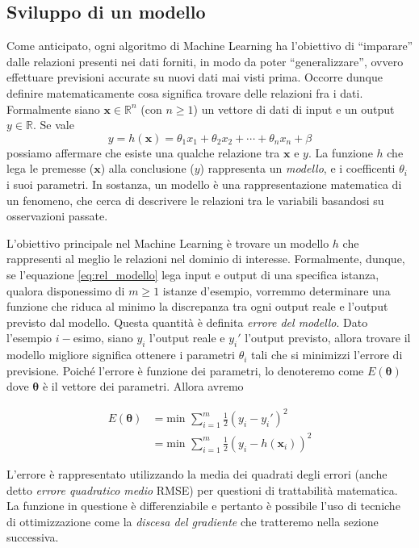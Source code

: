 \documentclass[12pt,a4paper,twoside,openright]{book}
\begin{document}
\subsection{Sviluppo di un modello}

Come anticipato, ogni algoritmo di Machine Learning ha l'obiettivo di ``imparare'' dalle relazioni presenti nei dati forniti, in modo da poter ``generalizzare'', ovvero effettuare previsioni accurate su nuovi dati mai visti prima.
Occorre dunque definire matematicamente cosa significa trovare delle relazioni fra i dati. Formalmente siano $\mathbf{x} \in \mathbb{R}^n$ (con $n \geq 1$) un vettore di dati di input e un output $y \in \mathbb{R}$. Se vale
\begin{equation}\label{eq:rel_modello}
    y = h(\mathbf{x}) = \theta_1 x_1 + \theta_2 x_2 + \cdots + \theta_n x_n + \beta
\end{equation}
possiamo affermare che esiste una qualche relazione tra $\mathbf{x}$ e $y$.
La funzione $h$ che lega le premesse ($\mathbf{x}$) alla conclusione ($y$) rappresenta un \emph{modello}, e i coefficenti $\theta_i$ i suoi parametri. 
In sostanza, un modello è una rappresentazione matematica di un fenomeno, che cerca di descrivere le relazioni tra le variabili basandosi su osservazioni passate.

L'obiettivo principale nel Machine Learning è trovare un modello $h$ che rappresenti al meglio le relazioni nel dominio di interesse. Formalmente, dunque, se l'equazione \ref{eq:rel_modello} lega input e output di una specifica istanza, qualora disponessimo di $m \geq 1$ istanze d'esempio, vorremmo determinare una funzione che riduca al minimo la discrepanza tra ogni output reale e l'output previsto dal modello. Questa quantità è definita \emph{errore del modello}.
Dato l'esempio $i-$esimo, siano $y_i$ l'output reale e $y_i'$ l'output previsto, allora trovare il modello migliore significa ottenere i parametri $\theta_i$ tali che si minimizzi l'errore di previsione.
Poiché l'errore è funzione dei parametri, lo denoteremo come $E(\mathbf{\theta})$ dove $\mathbf{\theta}$ è il vettore dei parametri. Allora avremo

\begin{align*}
    E(\mathbf{\theta}) &=\text{min } \sum_{i=1}^m \frac{1}{2}(y_i - y_i')^2 \\
    &=\text{min } \sum_{i=1}^m \frac{1}{2}\left(y_i - h\left(\mathbf{x}_i\right)\right)^2
\end{align*}

L'errore è rappresentato utilizzando la media dei quadrati degli errori (anche detto \emph{errore quadratico medio} RMSE) per questioni di trattabilità matematica. La funzione in questione è differenziabile e pertanto è possibile l'uso di tecniche di ottimizzazione come la \emph{discesa del gradiente} che tratteremo nella sezione successiva.
\end{document}

